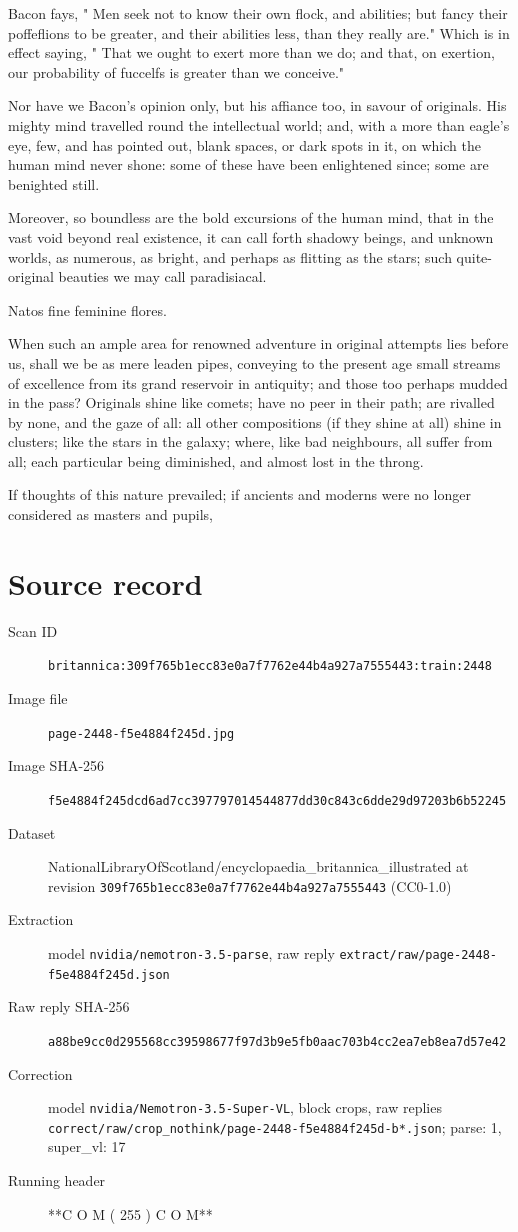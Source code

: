 \documentclass{article}
\begin{document}
Bacon fays, " Men seek not to know their own flock, and abilities; but fancy their poffeflions to be greater, and their abilities less, than they really are." Which is in effect saying, " That we ought to exert more than we do; and that, on exertion, our probability of fuccelfs is greater than we conceive."

Nor have we Bacon's opinion only, but his affiance too, in savour of originals. His mighty mind travelled round the intellectual world; and, with a more than eagle's eye, few, and has pointed out, blank spaces, or dark spots in it, on which the human mind never shone: some of these have been enlightened since; some are benighted still.

Moreover, so boundless are the bold excursions of the human mind, that in the vast void beyond real existence, it can call forth shadowy beings, and unknown worlds, as numerous, as bright, and perhaps as flitting as the stars; such quite-original beauties we may call paradisiacal.

Natos fine feminine flores.

When such an ample area for renowned adventure in original attempts lies before us, shall we be as mere leaden pipes, conveying to the present age small streams of excellence from its grand reservoir in antiquity; and those too perhaps mudded in the pass? Originals shine like comets; have no peer in their path; are rivalled by none, and the gaze of all: all other compositions (if they shine at all) shine in clusters; like the stars in the galaxy; where, like bad neighbours, all suffer from all; each particular being diminished, and almost lost in the throng.

If thoughts of this nature prevailed; if ancients and moderns were no longer considered as masters and pupils,


\section*{Source record}
\begin{description}
\item[Scan ID] \texttt{britannica:309f765b1ecc83e0a7f7762e44b4a927a7555443:train:2448}
\item[Image file] \texttt{page-2448-f5e4884f245d.jpg}
\item[Image SHA-256] \texttt{f5e4884f245dcd6ad7cc397797014544877dd30c843c6dde29d97203b6b52245}
\item[Dataset] NationalLibraryOfScotland/encyclopaedia\_britannica\_illustrated at revision \texttt{309f765b1ecc83e0a7f7762e44b4a927a7555443} (CC0-1.0)
\item[Extraction] model \texttt{nvidia/nemotron-3.5-parse}, raw reply \texttt{extract/raw/page-2448-f5e4884f245d.json}
\item[Raw reply SHA-256] \texttt{a88be9cc0d295568cc39598677f97d3b9e5fb0aac703b4cc2ea7eb8ea7d57e42}
\item[Correction] model \texttt{nvidia/Nemotron-3.5-Super-VL}, block crops, raw replies \texttt{correct/raw/crop\_nothink/page-2448-f5e4884f245d-b*.json}; parse: 1, super\_vl: 17
\item[Running header] **C O M ( 255 ) C O M**
\end{description}
\end{document}
